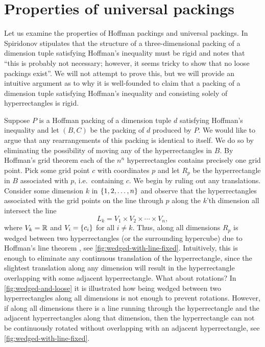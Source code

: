 \section{Properties of universal packings}
\noindent Let us examine the properties of Hoffman packings and universal packings.
In \cite[p. 1]{Spiridonov_2003} Spiridonov stipulates that the structure of a three-dimensional packing of a dimension tuple satisfying Hoffman's inequality must be rigid and notes that ``this is probably not necessary; however, it seems tricky to show that no loose packings exist''. We will not attempt to prove this, but we will provide an intuitive argument as to why it is well-founded to claim that a packing of a dimension tuple satisfying Hoffman's inequality and consisting solely of hyperrectangles is rigid.

Suppose $P$ is a Hoffman packing of a dimension tuple $d$ satisfying Hoffman's inequality and let $(B, C)$ be the packing of $d$ produced by $P$. We would like to argue that any rearrangements of this packing is identical to itself. We do so by eliminating the possibility of moving any of the hyperrectangles in $B$. By Hoffman's grid theorem  each of the $n^n$ hyperrectangles contains precisely one grid point. Pick some grid point $c$ with coordinates $p$ and let $R_p$ be the hyperrectangle in $B$ associated with $p$, i.e.\ containing $c$. We begin by ruling out any translations. Consider some dimension $k$ in $\left\{ 1, 2, \dotsc, n \right\}$ and observe that the hyperrectangles associated with the grid points on the line through $p$ along the $k$'th dimension all intersect the line
\[
L_k = V_1 \times V_2 \times \dotsb \times V_n,
\]
where $V_k = \mathbb{R}$ and $V_i = \left\{ c_i \right\}$ for all $i \neq k$. Thus, along all dimensions $R_p$ is wedged between two hyperrectangles (or the surrounding hypercube) due to Hoffman's line theorem , see \cref{fig:wedged-with-line-fixed}. Intuitively, this is enough to eliminate any continuous translation of the hyperrectangle, since the slightest translation along any dimension will result in the hyperrectangle overlapping with some adjacent hyperrectangle. What about rotations? In \cref{fig:wedged-and-loose} it is illustrated how being wedged between two hyperrectangles along all dimensions is not enough to prevent rotations. However, if along all dimensions there is a line running through the hyperrectangle and the adjacent hyperrectangles along that dimension, then the hyperrectangle can not be continuously rotated without overlapping with an adjacent hyperrectangle, see \cref{fig:wedged-with-line-fixed}.

